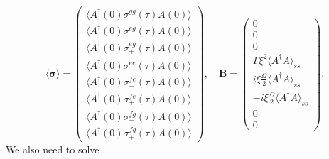 \documentclass{article}
\begin{document}
\begin{equation}
	\langle \bm{\sigma} \rangle = 
	\begin{pmatrix}
		\langle A^{\dagger}(0) \sigma^{gg}(\tau) A(0) \rangle \\
		\langle A^{\dagger}(0) \sigma^{eg}_{-}(\tau) A(0) \rangle \\
		\langle A^{\dagger}(0) \sigma^{eg}_{+}(\tau) A(0) \rangle \\
		\langle A^{\dagger}(0) \sigma^{ee}(\tau) A(0) \rangle \\
		\langle A^{\dagger}(0) \sigma^{fe}_{-}(\tau) A(0) \rangle \\
		\langle A^{\dagger}(0) \sigma^{fe}_{+}(\tau) A(0) \rangle \\
		\langle A^{\dagger}(0) \sigma^{fg}_{-}(\tau) A(0) \rangle \\
		\langle A^{\dagger}(0) \sigma^{fg}_{+}(\tau) A(0) \rangle
	\end{pmatrix}, \quad \bm{B} = 
	\begin{pmatrix}
		0 \\
		0 \\
		0 \\
		\Gamma \xi^{2} \langle A^{\dagger} A \rangle_{ss} \\
		i \xi \frac{\Omega}{2} \langle A^{\dagger} A \rangle_{ss} \\
		-i \xi \frac{\Omega}{2} \langle A^{\dagger} A \rangle_{ss} \\
		0 \\
		0
	\end{pmatrix}.
\end{equation}
We also need to solve
\end{document}
